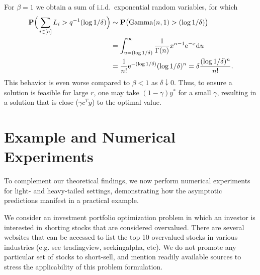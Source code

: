 \documentclass[a4paper, a4wide, 10pt, reqno]{amsart}
\theoremstyle{plain}
\newcommand{\rd}{\mathrm{d}}
\begin{document}
For $\beta=1$ we obtain a sum of i.i.d.\ exponential random variables, for which  
\begin{align}
 {\bf P}\Big(\sum_{i\in[n]}L_i> q^{-1}(\log 1/\delta)\Big)&\sim{\bf P}\big(\mathrm{Gamma}(n,1)> (\log 1/\delta)\big)\\&=\int_{u=(\log 1/\delta)}^\infty\frac{1}{\Gamma(n)}x^{n-1}{\mathrm{e}}^{-x}\rd u\\ &= \frac{1}{n!}\mathrm{e}^{-(\log 1/\delta)}(\log 1/\delta)^{n}=\delta \frac{(\log 1/\delta)^n}{n!}.
\end{align} This behavior is even worse compared to $\beta<1$ as $\delta\downarrow 0$. Thus, to ensure a solution is feasible for large $r$, one may take $(1-\gamma)y^*$ for a small $\gamma$, resulting in a solution that is close ($\gamma c^T y$) to the optimal value.




\section{Example and Numerical Experiments}
\label{sec-numeric}

To complement our theoretical findings, we now perform  numerical experiments for light- and heavy-tailed settings, demonstrating how the asymptotic predictions manifest in a practical example.


 We consider an investment portfolio optimization problem in which an investor is interested in shorting stocks that are considered overvalued. There are several websites that can be accessed to list the top 10 overvalued stocks in various industries (e.g. see tradingview, seekingalpha, etc). We do not promote any particular set of stocks to short-sell, and mention readily available sources to stress the applicability of this problem formulation. 
\end{document}
